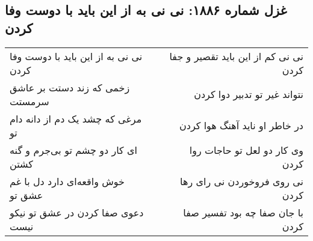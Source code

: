 \begin{center}
\section*{غزل شماره ۱۸۸۶: نی نی به از این باید با دوست وفا کردن}
\label{sec:1886}
\begin{longtable}{l p{0.5cm} r}
نی نی به از این باید با دوست وفا کردن
&&
نی نی کم از این باید تقصیر و جفا کردن
\\
زخمی که زند دستت بر عاشق سرمستت
&&
نتواند غیر تو تدبیر دوا کردن
\\
مرغی که چشد یک دم از دانه دام تو
&&
در خاطر او ناید آهنگ هوا کردن
\\
ای کار دو چشم تو بی‌جرم و گنه کشتن
&&
وی کار دو لعل تو حاجات روا کردن
\\
خوش واقعه‌ای دارد دل با غم عشق تو
&&
نی روی فروخوردن نی رای رها کردن
\\
دعوی صفا کردن در عشق تو نیکو نیست
&&
با جان صفا چه بود تفسیر صفا کردن
\\
\end{longtable}
\end{center}
